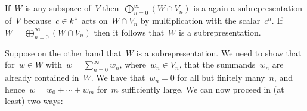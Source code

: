 \subsection{}

If~$W$ is any subspace of~$V$ then~$\bigoplus_{n=0}^\infty (W \cap V_n)$ is a again a subrepresentation of~$V$ because~$c \in k^\times$ acts on~$W \cap V_n$ by multiplication with the scalar~$c^n$.
If~$W = \bigoplus_{n=0}^\infty (W \cap V_n)$ then it follows that~$W$ is a subrepresentation.

Suppose on the other hand that~$W$ is a subrepresentation.
We need to show that for~$w \in W$ with~$w = \sum_{n=0}^\infty w_n$, where~$w_n \in V_n$, that the summands~$w_n$ are already contained in~$W$.
We have that~$w_n = 0$ for all but finitely many~$n$, and hence~$w = w_0 + \dotsb + w_m$ for~$m$ sufficiently large.
We can now proceed in (at least) two ways:
